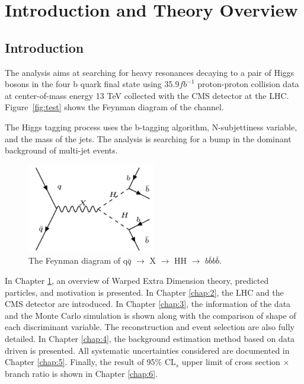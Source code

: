 \chapter{Introduction and Theory Overview} \label{chap:1}

\section{Introduction}
The analysis aims at searching for heavy resonances decaying to a pair of Higgs
bosons in the four b quark final state using 35.9$fb^{-1}$ proton-proton collision data at center-of-mass energy 13 TeV collected with the CMS detector at the LHC. Figure~\ref{fig:test} shows the Feynman diagram of the channel. 

The Higgs tagging process uses the b-tagging algorithm, N-subjettiness variable, and the mass of the jets. The analysis is searching for a bump in the dominant background of multi-jet events.


\begin{figure}[t]
  \begin{center}

    \includegraphics[width=0.5\textwidth]{Figures/Screenshot_20170601_160641.pdf} 
    \end{center}
  \caption{The Feynman diagram of q$\bar{q}$ $\rightarrow$ X $\rightarrow$ HH $\rightarrow$ $b\bar{b}b\bar{b}$.}
  	
\end{figure}
\label{fig:test}

In Chapter \ref{chap:1}, an overview of Warped Extra Dimension theory, predicted particles, and motivation is presented. In Chapter \ref{chap:2}, the LHC and the CMS detector are introduced. In Chapter \ref{chap:3}, the information of the data and the Monte Carlo simulation is shown along with the comparison of shape of each discriminant variable. The reconstruction and event selection are also fully detailed. In Chapter \ref{chap:4}, the background estimation method based on data driven is presented. All systematic uncertainties considered are documented in Chapter \ref{chap:5}. Finally, the result of 95$\% $ CL$_{s}$ upper limit of cross section $\times$ branch ratio is shown in Chapter \ref{chap:6}. 

